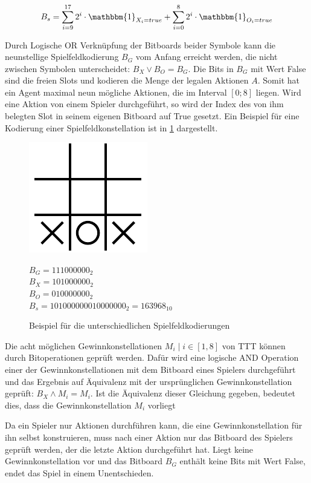 \begin{equation}\label{eq:bitboard_bs}\equationentry{Berechnung des Zustandsidentifikators $B_s$}
   B_s= \sum_{i=9}^{17}2^{i}\cdot \mathbbm{1}_{X_i=true} + \sum_{i=0}^{8}2^{i}\cdot \mathbbm{1}_{O_i=true}
\end{equation}

Durch Logische OR Verknüpfung der Bitboards beider Symbole kann die neunstellige Spielfeldkodierung $B_G$ vom Anfang erreicht werden, die nicht zwischen Symbolen unterscheidet: $B_X \lor B_O = B_G$. 
Die Bits in $B_G$ mit Wert False sind die freien Slots und kodieren die Menge der legalen Aktionen $A$. 
Somit hat ein Agent maximal neun mögliche Aktionen, die im Interval $[0; 8]$ liegen. 
Wird eine Aktion von einem Spieler durchgeführt, so wird der Index des von ihm belegten Slot in seinem eigenen Bitboard auf True gesetzt.
Ein Beispiel für eine Kodierung einer Spielfeldkonstellation ist in \cref{fig:ttt_163968} dargestellt.

\begin{figure}
   \begin{minipage}[c]{.5\textwidth}
   \centering
    \includegraphics[scale=0.7]{04_Artefakte/01_Abbildungen/ttt_boards/ttt_163968.pdf}
   \end{minipage}%
   \begin{minipage}[c]{.5\textwidth}
      $B_G = 111000000_2$ \\
      $B_X = 101000000_2$ \\
      $B_O = 010000000_2$ \\
      $B_s = 101000000010000000_2 = 163968_{10}$
   \end{minipage}
   \caption{Beispiel für die unterschiedlichen Spielfeldkodierungen}
   \label{fig:ttt_163968}
\end{figure}

Die acht möglichen Gewinnkonstellationen $M_{i} \mid i \in [1,8]$ von \acs{TTT} können durch Bitoperationen geprüft werden.
Dafür wird eine logische AND Operation einer der Gewinnkonstellationen mit dem Bitboard eines Spielers durchgeführt und das Ergebnis auf Äquivalenz mit der ursprünglichen Gewinnkonstellation geprüft: $B_X \land M_i = M_i$. 
Ist die Äquivalenz dieser Gleichung gegeben, bedeutet dies, dass die Gewinnkonstellation $M_i$ vorliegt

Da ein Spieler nur Aktionen durchführen kann, die eine Gewinnkonstellation für ihn selbst konstruieren, muss nach einer Aktion nur das Bitboard des Spielers geprüft werden, der die letzte Aktion durchgeführt hat. 
Liegt keine Gewinnkonstellation vor und das Bitboard $B_G$ enthält keine Bits mit Wert False, endet das Spiel in einem Unentschieden.